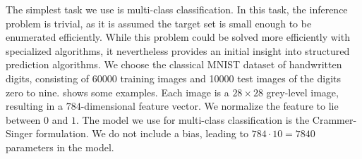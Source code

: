 The simplest task we use is multi-class classification. In this task,
the inference problem is trivial, as it is assumed the target set is small enough
to be enumerated efficiently. While this problem could be solved more efficiently
with specialized algorithms, it nevertheless provides an initial insight into structured
prediction algorithms.
We choose the classical MNIST dataset of handwritten digits, consisting of
60000 training images and 10000 test images of the digits zero to nine.
 shows some examples. Each image is a $28 \times 28$
grey-level image, resulting in a $784$-dimensional feature vector. We normalize
the feature to lie between $0$ and $1$.
%
\enlargethispage{15mm}
The model we use for multi-class classification is the Crammer-Singer
formulation. We do not include a bias, leading to $784 \cdot 10 = 7840$
parameters in the model.


